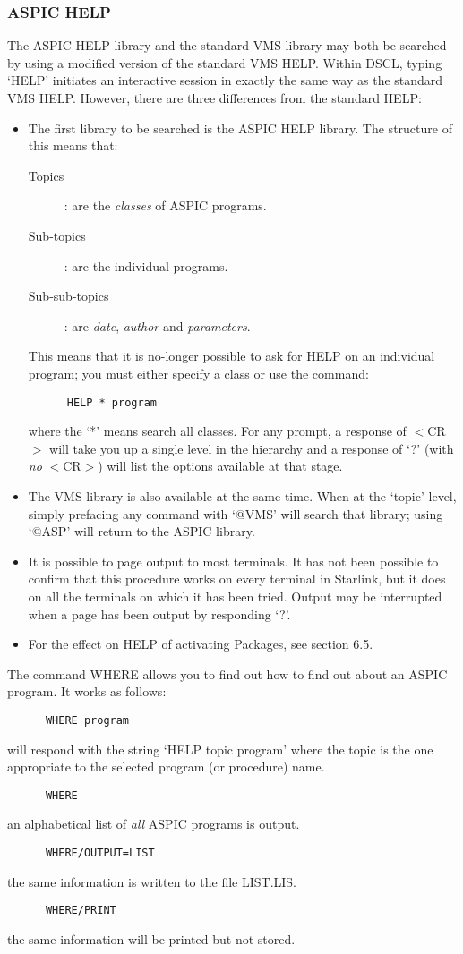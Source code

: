 \subsubsection {ASPIC HELP}
The ASPIC HELP library and the standard VMS library may both be searched by
using a modified version of the standard VMS HELP.
Within DSCL, typing `HELP' initiates an interactive session in exactly the same
way as the standard VMS HELP.
However, there are three differences from the standard HELP:
\begin{itemize}
\item The first library to be searched is the ASPIC HELP library. The structure
of this means that:
\begin{description}
\begin{description}
\item [Topics]: are the {\em classes} of ASPIC programs.
\item [Sub-topics]: are the individual programs.
\item [Sub-sub-topics]: are {\em date}, {\em author} and {\em parameters}.
\end{description}
\end{description}
This means that it is no-longer possible to ask for HELP on an individual
program; you must either specify a class or use the command:
\begin{verbatim}
      HELP * program
\end{verbatim}
where the `*' means search all classes.
For any prompt, a response of $<$CR$>$ will take you up a single
level in the hierarchy and a response of `?' (with {\em no} $<$CR$>$) will list
the options available at that stage.
\item The VMS library is also available at the same time.
When at the `topic' level, simply prefacing any command with `@VMS' will search
that library; using `@ASP' will return to the ASPIC library.
\item It is possible to page output to most terminals.
It has not been possible to confirm that this procedure works on every terminal
in Starlink, but it does on all the terminals on which it has been tried.
Output may be interrupted when a page has been output by responding `?'.
\item For the effect on HELP of activating Packages, see section 6.5.
\end{itemize}
The command WHERE allows you to find out how to find out about an ASPIC
program.
It works as follows:
\begin{verbatim}
      WHERE program
\end{verbatim}
will respond with the string `HELP topic program' where the topic is the one
appropriate to the selected program (or procedure) name.
\begin{verbatim}
      WHERE
\end{verbatim}
an alphabetical list of {\em all} ASPIC programs is output.
\begin{verbatim}
      WHERE/OUTPUT=LIST
\end{verbatim}
the same information is written to the file LIST.LIS.
\begin{verbatim}
      WHERE/PRINT
\end{verbatim}
the same information will be printed but not stored.
